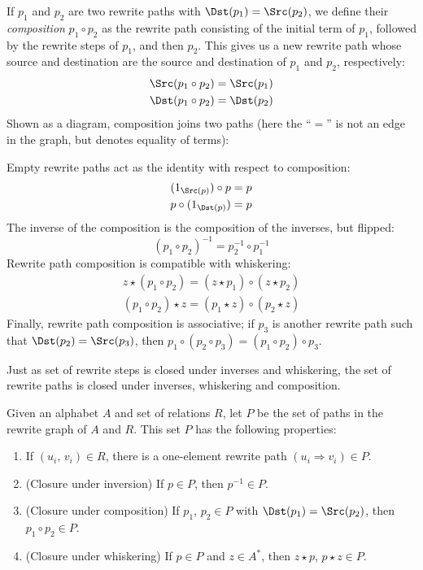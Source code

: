 \documentclass[../generics]{subfiles}
\begin{document}
\begin{definition}
%
If $p_1$ and $p_2$ are two rewrite paths with $\Dst(p_1)=\Src(p_2)$, we define their \emph{composition} \index{$\circ$}$p_1 \circ p_2$ as the rewrite path consisting of the initial term of $p_1$, followed by the rewrite steps of $p_1$, and then $p_2$. This gives us a new rewrite path whose source and destination are the source and destination of $p_1$ and $p_2$, respectively:
\begin{gather*}
\Src(p_1 \circ p_2) = \Src(p_1)\\
\Dst(p_1 \circ p_2) = \Dst(p_2)
\end{gather*}
Shown as a diagram, composition joins two paths (here the ``$=$'' is not an edge in the graph, but denotes equality of terms):
\begin{quote}
\end{quote}
Empty rewrite paths act as the identity with respect to composition:
\begin{gather*}
(1_{\Src(p)})\circ p = p\\
p\circ (1_{\Dst(p)}) = p
\end{gather*}
The inverse of the composition is the composition of the inverses, but flipped:
\[(p_1 \circ p_2)^{-1} = p_2^{-1} \circ p_1^{-1}\]
Rewrite path composition is compatible with whiskering:
\begin{gather*}
z\star (p_1 \circ p_2) = (z\star p_1) \circ (z\star p_2)\\
(p_1 \circ p_2)\star z = (p_1\star z) \circ (p_2\star z)
\end{gather*}
Finally, rewrite path composition is associative; if $p_3$ is another rewrite path such that $\Dst(p_2)=\Src(p_3)$, then $p_1 \circ (p_2 \circ p_3) = (p_1 \circ p_2) \circ p_3$.
\end{definition}
Just as set of rewrite steps is closed under inverses and whiskering, the set of rewrite paths is closed under inverses, whiskering and composition.
\begin{proposition}
Given an alphabet $A$ and set of relations $R$, let $P$ be the set of paths in the rewrite graph of $A$ and $R$. This set $P$ has the following properties:
\begin{enumerate}
\item If $(u_i,\,v_i)\in R$, there is a one-element rewrite path $(u_i\Rightarrow v_i)\in P$.
\item (Closure under inversion) If $p\in P$, then $p^{-1}\in P$.
\item (Closure under composition) If $p_1$, $p_2\in P$ with $\Dst(p_1)=\Src(p_2)$, then $p_1\circ p_2\in P$.
\item (Closure under whiskering) If $p\in P$ and $z\in A^*$, then $z\star p$, $p\star z\in P$.
\end{enumerate}
\end{proposition}
\end{document}
